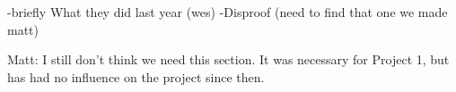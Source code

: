\color{red}
-briefly What they did last year (wes) 
-Disproof (need to find that one we made matt)

Matt: I still don't think we need this section. It was necessary for Project 1, but has had no influence on the project since then.
\color{black}